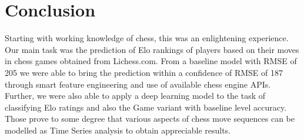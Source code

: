 \documentclass[11pt,a4paper]{article}
\begin{document}
\section{Conclusion}
Starting with working knowledge of chess, this was an enlightening experience. Our main task was the prediction of Elo rankings of players based on their moves in chess games obtained from Lichess.com. From a baseline model with RMSE of 205 we were able to bring the prediction within a confidence of RMSE of 187 through smart feature engineering and use of available chess engine APIs. Further, we were also able to apply a deep learning model to the task of classifying Elo ratings and also the Game variant with baseline level accuracy. Those prove to some degree that various aspects of chess move sequences can be modelled as Time Series analysis to obtain appreciable results.



\end{document}
